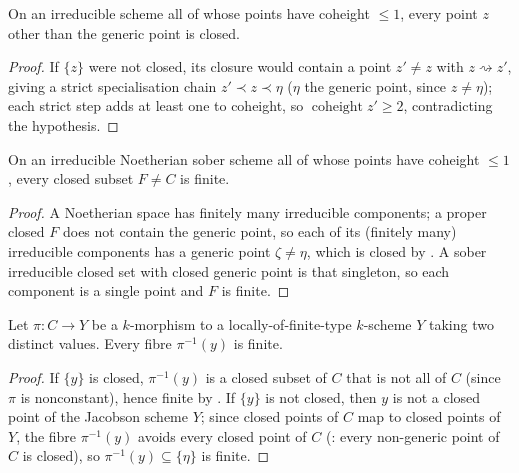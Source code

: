 \begin{lemma}
  \label{lem:adelic_nongeneric_closed}
  \leanok
  On an irreducible scheme all of whose points have coheight \(\le 1\),
  every point \(z\) other than the generic point is closed.
\end{lemma}
\begin{proof}
  \leanok
  If \(\{z\}\) were not closed, its closure would contain a point
  \(z' \ne z\) with \(z \rightsquigarrow z'\), giving a strict
  specialisation chain \(z' \prec z \prec \eta\) (\(\eta\) the generic
  point, since \(z \ne \eta\)); each strict step adds at least one to
  coheight, so \(\operatorname{coheight} z' \ge 2\), contradicting the
  hypothesis.
\end{proof}

\begin{lemma}
  \label{lem:adelic_proper_closed_finite}
  \leanok
  On an irreducible Noetherian sober scheme all of whose points have
  coheight \(\le 1\), every closed subset \(F \ne C\) is finite.
\end{lemma}
\begin{proof}
  \leanok
  A Noetherian space has finitely many irreducible components; a proper
  closed \(F\) does not contain the generic point, so each of its
  (finitely many) irreducible components has a generic point \(\zeta
  \ne \eta\), which is closed by .
  A sober irreducible closed set with closed generic point is that
  singleton, so each component is a single point and \(F\) is finite.
\end{proof}

\begin{lemma}
  \label{lem:adelic_nonconstant_finite_fibres}
  \leanok
  Let \(\pi \colon C \to Y\) be a \(k\)-morphism to a
  locally-of-finite-type \(k\)-scheme \(Y\) taking two distinct values.
  Every fibre \(\pi^{-1}(y)\) is finite.
\end{lemma}
\begin{proof}
  \leanok
  If \(\{y\}\) is closed, \(\pi^{-1}(y)\) is a closed subset of \(C\)
  that is not all of \(C\) (since \(\pi\) is nonconstant), hence finite
  by . If \(\{y\}\) is not closed,
  then \(y\) is not a closed point of the Jacobson scheme \(Y\); since
  closed points of \(C\) map to closed points of \(Y\), the fibre
  \(\pi^{-1}(y)\) avoids every closed point of \(C\)
  (: every non-generic point of
  \(C\) is closed), so \(\pi^{-1}(y) \subseteq \{\eta\}\) is finite.
\end{proof}

